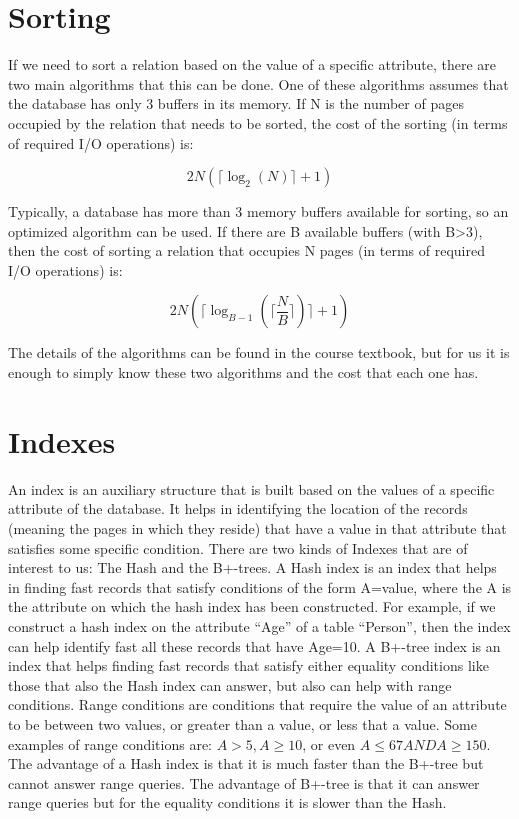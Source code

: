 \documentclass[12pt]{article}
\begin{document}
\section{Sorting}
If we need to sort a relation based on the value of a specific attribute, there are two main algorithms that this can be done. One of these algorithms assumes that the database has only 3 buffers in its memory. If N is the number of pages occupied by the relation that needs to be sorted, the cost of the sorting (in terms of required I/O operations) is:

$$
2N(\lceil \log_2(N)\rceil + 1)
$$


Typically, a database has more than 3 memory buffers available for sorting, so an optimized algorithm can be used. If there are B available buffers (with B>3), then the cost of sorting a relation that occupies N pages (in terms of required I/O operations) is:

$$
2N(\lceil \log_{B - 1}(\lceil\frac{N}{B}\rceil)\rceil + 1)
$$

The details of the algorithms can be found in the course textbook, but for us it is enough to simply know these two algorithms and the cost that each one has.

\section{Indexes}

An index is an auxiliary structure that is built based on the values of a specific attribute of the database. It helps in identifying the location of the records (meaning the pages in which they reside) that have a value in that attribute that satisfies some specific condition. There are two kinds of Indexes that are of interest to us: The Hash and the B+-trees.
A Hash index is an index that helps in finding fast records that satisfy conditions of the form A=value, where the A is the attribute on which the hash index has been constructed. For example, if we construct a hash index on the attribute “Age” of a table “Person”, then the index can help identify fast all these records that have Age=10.
A B+-tree index is an index that helps finding fast records that satisfy either equality conditions like those that also the Hash index can answer, but also can help with range conditions. Range conditions are conditions that require the value of an attribute to be between two values, or greater than a value, or less that a value. Some examples of range conditions are: $A > 5, A \ge 10$, or even $A \le 67 AND A \ge 150$.
The advantage of a Hash index is that it is much faster than the B+-tree but cannot answer range queries. The advantage of B+-tree is that it can answer range queries but for the equality conditions it is slower than the Hash.
\end{document}
